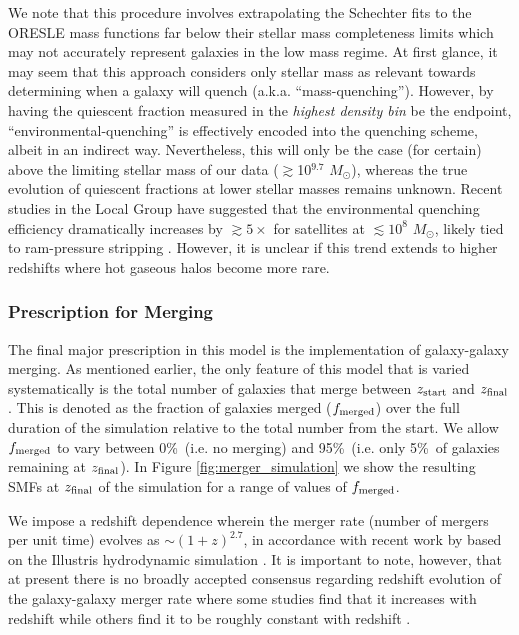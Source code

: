 \documentclass[a4paper,fleqn,usenatbib]{mnras}
\def\msol{$M_{\odot}$}
\begin{document}
We note that this procedure involves extrapolating the Schechter fits to the ORESLE mass functions far below their stellar mass completeness limits which may not accurately represent galaxies in the low mass regime.
At first glance, it may seem that this approach considers only stellar mass as relevant towards determining when a galaxy will quench (a.k.a. ``mass-quenching'').
However, by having the quiescent fraction measured in the {\it highest density bin} be the endpoint, ``environmental-quenching'' is effectively encoded into the quenching scheme, albeit in an indirect way.
Nevertheless, this will only be the case (for certain) above the limiting stellar mass of our data ($\gtrsim$10$^{9.7}$ \msol), whereas the true evolution of quiescent fractions at lower stellar masses remains unknown.
Recent studies in the Local Group have suggested that the environmental quenching efficiency dramatically increases by $\gtrsim$$5\times$ for satellites at $\lesssim$$10^8$ \msol , likely tied to ram-pressure stripping \citep{Fillingham2015, Fillingham2016}.
However, it is unclear if this trend extends to higher redshifts where hot gaseous halos become more rare.




\subsubsection{Prescription for Merging}


The final major prescription in this model is the implementation of galaxy-galaxy merging.
As mentioned earlier, the only feature of this model that is varied systematically is the total number of galaxies that merge between $z_{\rm{start}}$ and $z_{\rm{final}}$.
This is denoted as the fraction of galaxies merged ($f_{\rm{merged}}$) over the full duration of the simulation relative to the total number from the start.
We allow $f_{\rm{merged}}$ to vary between 0\%\ (i.e. no merging) and 95\%\ (i.e. only 5\%\ of galaxies remaining at $z_{\rm{final}}$).
In Figure \ref{fig:merger_simulation} we show the resulting SMFs at $z_{\rm{final}}$ of the simulation for a range of values of $f_{\rm{merged}}$.


We impose a redshift dependence wherein the merger rate (number of mergers per unit time) evolves as $\sim$$(1 + z)^{2.7}$, in accordance with recent work by \citet{RodriguezGomez2015} based on the Illustris hydrodynamic simulation \citep{Genel2014}.
It is important to note, however, that at present there is no broadly accepted consensus regarding redshift evolution of the galaxy-galaxy merger rate where some studies find that it increases with redshift \citep[e.g.][]{Hopkins2010a, Hopkins2010b, Man2012} while others find it to be roughly constant with redshift \citep[e.g.][]{Guo2008, Williams2011}.
\end{document}
